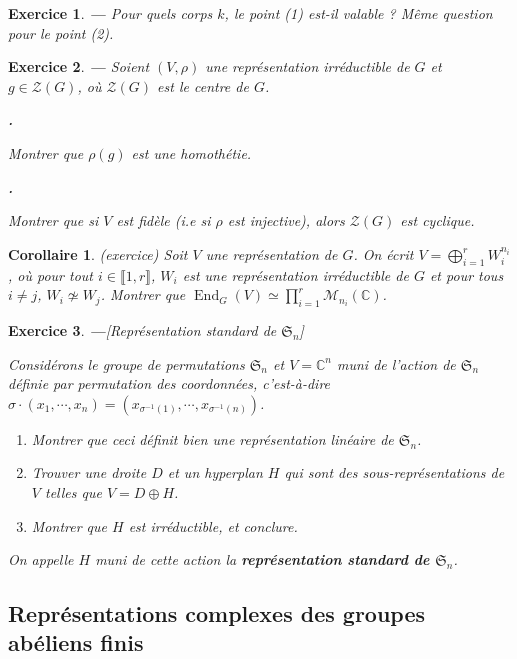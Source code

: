 \documentclass[a4paper]{article}
\newcounter{question}
\newcounter{sousquestion}
\newtheorem{enonce}{Exercice}
\newenvironment{exo}[0]{\begin{enonce}{\bf ---}\rm\setcounter{question}{1}}{\end{enonce}}
\newcommand{\quest}{{\setcounter{sousquestion}{1}\vspace{0.1cm}\bf \arabic{question}.\hspace{0.1cm}}\addtocounter{question}{1}}
\theoremstyle{definition} %
\theoremstyle{plain} %
\newtheorem{Cor}[Def]{Corollaire} %
\theoremstyle{remark} %
\begin{document}
 \begin{exo}
Pour quels corps $k$, le point (1) est-il valable ? Même question pour le point (2).
 	\end{exo}
 	
 	
\begin{exo}
Soient $(V,\rho)$ une représentation irréductible de $G$ et $g\in \mathcal{Z}(G)$, où $\mathcal{Z}(G)$ est le centre de $G$.

\quest  Montrer que $\rho(g)$ est une homothétie.

\quest Montrer que si $V$ est fidèle (i.e si $\rho$ est injective), alors $\mathcal{Z}(G)$ est cyclique.
\end{exo} 	

\begin{Cor} (exercice)
Soit $V$ une représentation de $G$. On écrit $V=\bigoplus_{i=1}^r W_i^{n_i}$, où pour tout $i\in  \llbracket 1,r\rrbracket$, $W_i$ est une représentation irréductible de $G$ et pour tous $i\neq j$, $W_i \not \simeq W_j$.	Montrer que 
	$\displaystyle \operatorname{End}_G(V) \simeq \prod_{i=1}^r \mathcal{M}_{n_i} (\mathbb{C})$.
\end{Cor}


\begin{exo}[Représentation standard de $\mathfrak{S}_n$]
	\hspace*{\fill}
	
	Considérons le groupe de permutations $\mathfrak{S}_n$ et $V = \mathbb{C}^n$ muni de l'action de $\mathfrak{S}_n$ définie par permutation des coordonnées, c'est-à-dire $\sigma \cdot (x_1, \cdots, x_n) = (x_{\sigma^{-1}(1)}, \cdots, x_{\sigma^{-1}(n)})$.
\begin{enumerate}
\item Montrer que ceci définit bien une représentation linéaire de $\mathfrak{S}_n$.
\item Trouver une droite $D$ et un hyperplan $H$ qui sont des sous-représentations de $V$ telles que $V = D \oplus H$.
\item Montrer que $H$ est irréductible, et conclure.
\end{enumerate}
On appelle $H$ muni de cette action la \textbf{représentation standard de $\mathfrak{S}_n$}.
\end{exo}

\subsection{Représentations complexes des groupes abéliens finis}
\end{document}
